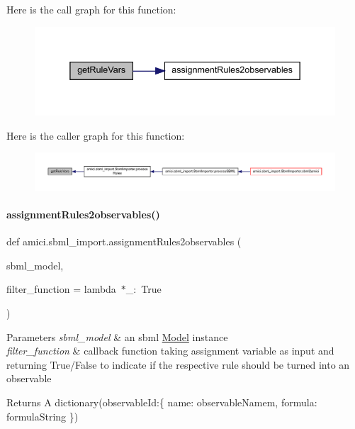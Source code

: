 Here is the call graph for this function\+:
\nopagebreak
\begin{figure}[H]
\begin{center}
\leavevmode
\includegraphics[width=338pt]{namespaceamici_1_1sbml__import_a64a5d0187cb4b3f69bceceb7d5638691_cgraph}
\end{center}
\end{figure}
Here is the caller graph for this function\+:
\nopagebreak
\begin{figure}[H]
\begin{center}
\leavevmode
\includegraphics[width=350pt]{namespaceamici_1_1sbml__import_a64a5d0187cb4b3f69bceceb7d5638691_icgraph}
\end{center}
\end{figure}
\mbox{\label{namespaceamici_1_1sbml__import_aaba72ac8b7d363e7720f36495ccc3285}} 
\paragraph{\texorpdfstring{assignment\+Rules2observables()}{assignmentRules2observables()}}
{\footnotesize\ttfamily def amici.\+sbml\+\_\+import.\+assignment\+Rules2observables (\begin{DoxyParamCaption}\item[{}]{sbml\+\_\+model,  }\item[{}]{filter\+\_\+function = {\ttfamily lambda~$\ast$\+\_\+\+:~True} }\end{DoxyParamCaption})}


\begin{DoxyParams}{Parameters}
{\em sbml\+\_\+model} & an sbml \mbox{\hyperlink{classamici_1_1_model}{Model}} instance\\
\hline
{\em filter\+\_\+function} & callback function taking assignment variable as input and returning True/\+False to indicate if the respective rule should be turned into an observable\\
\hline
\end{DoxyParams}
\begin{DoxyReturn}{Returns}
A dictionary(observable\+Id\+:\{ \textquotesingle{}name\textquotesingle{}\+: observable\+Namem, \textquotesingle{}formula\textquotesingle{}\+: formula\+String \}) 
\end{DoxyReturn}


